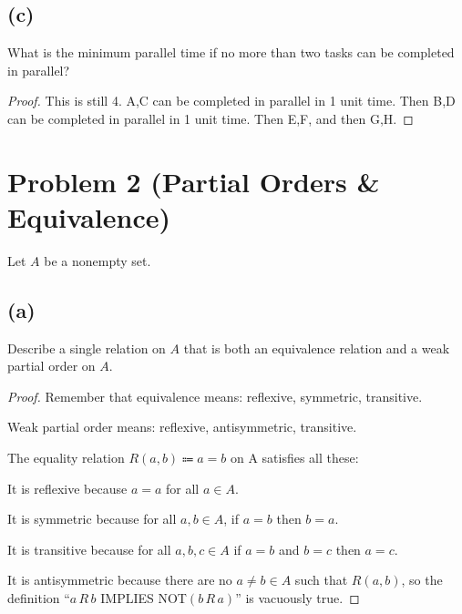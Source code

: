 \documentclass[14pt]{extarticle}
\begin{document}
\subsection{(c)}
What is the minimum parallel time if no more than two tasks can be completed in parallel?
\begin{proof}
This is still 4. A,C can be completed in parallel in 1 unit time. Then B,D can be completed in parallel in 1 unit time. Then E,F, and then G,H.
\end{proof}

\section{Problem 2 (Partial Orders \& Equivalence)}
Let $A$ be a nonempty set.
\subsection{(a)}
Describe a single relation on $A$ that is both an equivalence relation and a weak partial order on $A$.
\begin{proof}
Remember that equivalence means: reflexive, symmetric, transitive.

Weak partial order means: reflexive, antisymmetric, transitive.

The equality relation $R(a,b) \Coloneqq a = b$ on A satisfies all these: 

It is reflexive because $a = a$ for all $a \in A$.

It is symmetric because for all $a,b \in A$, if $a = b$ then $b = a$.

It is transitive because for all $a,b,c \in A$ if $a = b$ and $b = c$ then $a = c$.

It is antisymmetric because there are no $a \neq b \in A$ such that $R(a,b)$, so the definition ``$a \, R \, b$ IMPLIES NOT$(b \, R \, a)$'' is vacuously true.
\end{proof}
\end{document}
